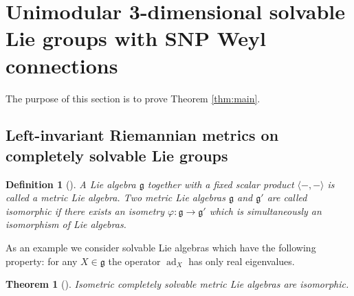 \documentclass[12pt]{article}
\newtheorem{theorem}{Theorem}
\newtheorem{definition}{Definition}
\begin{document}
  

\section{Unimodular 3-dimensional solvable Lie groups with SNP Weyl connections}

The purpose of this section is to prove Theorem \ref{thm:main}.
\subsection{Left-invariant Riemannian metrics on completely solvable Lie groups}
\begin{definition}[\cite{A}]\label{thm:aleks} {\rm  A Lie algebra $\mathfrak{g}$ together with a fixed scalar product $\langle-,-\rangle$ is called a metric Lie algebra. Two metric Lie algebras $\mathfrak{g}$ and $\mathfrak{g}'$ are called isomorphic if there exists an isometry  $\varphi:\mathfrak{g}\rightarrow\mathfrak{g}'$ which  is simultaneously  an isomorphism of Lie algebras.} 
\end{definition}
As an example we consider solvable Lie algebras which have the following property: for any $X\in\mathfrak{g}$ the operator $\operatorname{ad}_X$ has only real eigenvalues.  
\begin{theorem}[\cite{A}]\label{thm:aleks} Isometric completely solvable metric Lie algebras are isomorphic.
\end{theorem}
\end{document}
